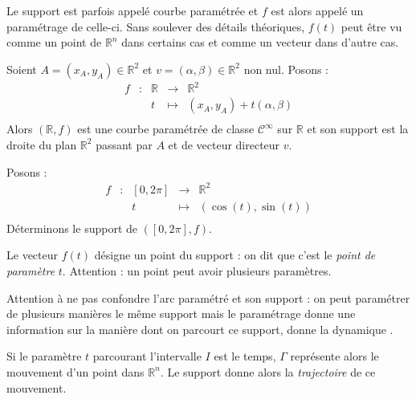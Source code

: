 \documentclass[a4paper,10pt]{report}
\begin{document}
\begin{rem} Le support est parfois appelé courbe paramétrée et $f$ est alors appelé un paramétrage de celle-ci. Sans soulever des détails théoriques, $f(t)$ peut être vu comme un point de $\mathbb{R}^n$ dans certains cas et comme un vecteur dans d'autre cas.
\end{rem}

\medskip

\begin{ex} Soient $A=(x_A,y_A) \in \mathbb{R}^2$ et $v= (\alpha, \beta) \in \mathbb{R}^2$ non nul. Posons :
$$ \begin{array}{ccccl}
f & : & \mathbb{R} & \rightarrow & \mathbb{R}^2 \\
 & & t & \mapsto & (x_A,y_A) + t (\alpha, \beta) \\
\end{array}$$
Alors $(\mathbb{R},f)$ est une courbe paramétrée de classe $\mathcal{C}^{\infty}$ sur $\mathbb{R}$ et son support est la droite du plan $\mathbb{R}^2$ passant par $A$ et de vecteur directeur $v$.
\end{ex}

\medskip

\begin{ex} Posons :
$$ \begin{array}{ccccl}
f & : & [0,2 \pi] & \rightarrow & \mathbb{R}^2 \\
 & & t & \mapsto & (\cos(t), \sin(t)) \\
\end{array}$$
Déterminons le support de $([0,2\pi],f)$.

\vspace{4cm}
\end{ex}

\begin{rems}
\item Le vecteur $f(t)$ désigne un point du support : on dit que c'est le \textit{point de paramètre} $t$. Attention : un point peut avoir plusieurs paramètres.
\item Attention à ne pas confondre l'arc paramétré et son support : on peut paramétrer de plusieurs manières le même support mais le paramétrage donne une information sur la manière dont on parcourt ce support, donne la \og dynamique \fg .
\item Si le paramètre $t$ parcourant l'intervalle $I$ est le temps, $\Gamma$ représente alors le mouvement d'un point dans $\mathbb{R}^n$. Le support donne alors la \textit{trajectoire} de ce mouvement.
\end{rems}
\end{document}
